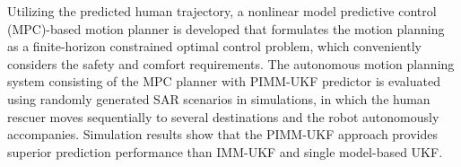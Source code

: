 \documentclass[journal]{IEEEtran}
\DeclareRobustCommand{\clnote}[1]{\ifthenelse{\boolean{include-notes}}%
{\textcolor{orange}{\textbf{CL: #1}}}{}}
\DeclareRobustCommand{\dhnote}[1]{\ifthenelse{\boolean{include-notes}}%
{\textcolor{blue}{\textbf{DH: #1}}}{}}
\begin{document}
    Utilizing the predicted human trajectory, a nonlinear model predictive control \cite{garcia1989model} (MPC)-based motion planner is developed that formulates the motion planning as a finite-horizon constrained optimal control problem, which conveniently considers the safety and comfort requirements.
The autonomous motion planning system consisting of the MPC planner with PIMM-UKF predictor is evaluated using randomly generated SAR scenarios in simulations, in which the human rescuer moves sequentially to several destinations and the robot autonomously accompanies.
	Simulation results show that the PIMM-UKF approach provides superior prediction performance than IMM-UKF and single model-based UKF.
\end{document}
